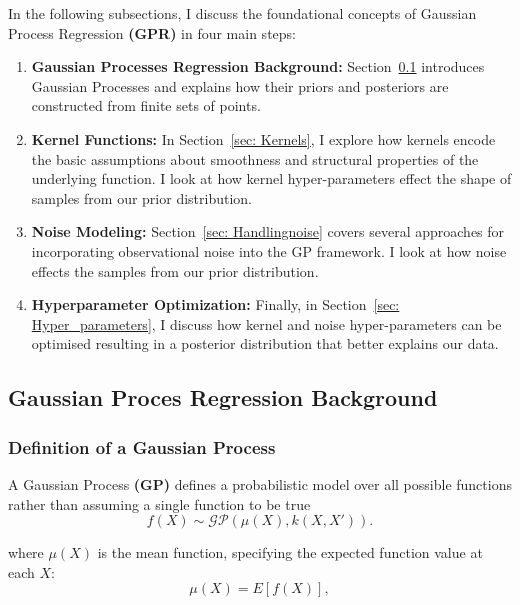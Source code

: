 \documentclass[11pt]{article}
\begin{document}
In the following subsections, I discuss the foundational concepts of Gaussian Process Regression \textbf{(GPR)} in four main steps:
\begin{enumerate}
    \item \textbf{Gaussian Processes Regression Background:} Section~\ref{sec: GP_backgroound} introduces Gaussian Processes and explains how their priors and posteriors are constructed from finite sets of points.
    \item \textbf{Kernel Functions:} In Section~\ref{sec: Kernels}, I explore how kernels encode the basic assumptions about smoothness and structural properties of the underlying function. I look at how kernel hyper-parameters effect the shape of samples from our prior distribution.
    \item \textbf{Noise Modeling:} Section~\ref{sec: Handlingnoise} covers several approaches for incorporating observational noise into the GP framework. I look at how noise effects the samples from our prior distribution.
    \item \textbf{Hyperparameter Optimization:} Finally, in Section~\ref{sec: Hyper_parameters}, I discuss how kernel and noise hyper-parameters can be optimised resulting in a posterior distribution that better explains our data.
\end{enumerate}

\subsection{Gaussian Proces Regression Background}
\label{sec: GP_backgroound}

\subsubsection*{Definition of a Gaussian Process}
\label{sec: Definition_of_GP}

A Gaussian Process \textbf{(GP)} defines a probabilistic model over all possible functions rather than assuming a single function to be true
\begin{equation}
f(X) \sim \mathcal{GP} (\mu(X), k(X, X')).
\label{eq: Initial_GP_distribution}
\end{equation}

\noindent
where \( \mu(X) \) is the mean function, specifying the expected function value at each \( X \):
\begin{equation}
    \mu(X) = {E}[f(X)],
    \label{eq: meandef}
\end{equation}
\end{document}
